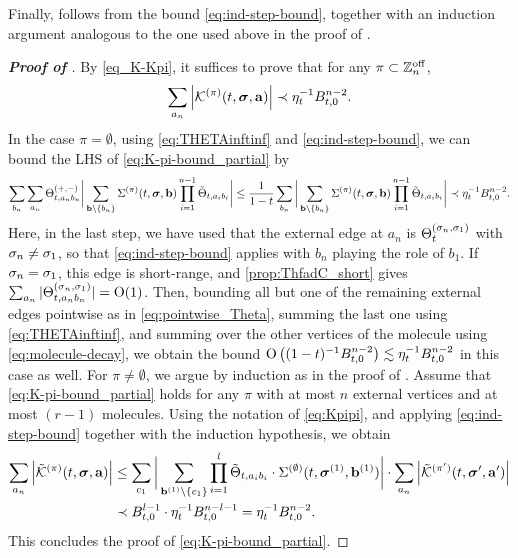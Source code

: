 Finally,  follows from the bound \eqref{eq:ind-step-bound}, together with an induction argument analogous to the one used above in the proof of .

\begin{proof}[\bf Proof of ]
By \eqref{eq_K-Kpi}, it suffices to prove that for any $\pi \subset \mathbb{Z}^{\rm{off}}_n$, 
\begin{equation}\label{eq:K-pi-bound_partial}
 \sum_{a_n}   \left|\mathcal{K}^{(\pi)}(t, {\boldsymbol{\sigma}}, \mathbf{a})\right| \prec \eta_t^{-1}B_{t,0}^{n-2}.
\end{equation}
In the case $\pi=\emptyset$, using \eqref{eq:THETAinftinf} and \eqref{eq:ind-step-bound}, we can bound the LHS of \eqref{eq:K-pi-bound_partial} by 
\begin{equation}\nonumber
 \sum_{b_n} \sum_{a_n}\Theta^{(+,-)}_{t,a_n b_n} \bigg|\sum_{\mathbf{b}\setminus \{b_n\}} \Sigma^{(\pi)}(t, {\boldsymbol{\sigma}}, \mathbf{b}) \prod_{i=1}^{n-1} \tilde{\Theta}_{t,a_i b_i}\bigg| \le \frac{1}{1-t}\sum_{b_n} \bigg|\sum_{\mathbf{b}\setminus \{b_n\}} \Sigma^{(\pi)}(t, {\boldsymbol{\sigma}}, \mathbf{b}) \prod_{i=1}^{n-1} \tilde{\Theta}_{t,a_i b_i}\bigg| \prec \eta_t^{-1}B_{t,0}^{n-2}.
\end{equation} 
Here, in the last step, we have used that the external edge at $a_n$ is $\Theta^{(\sigma_n,\sigma_1)}_t$ with $\sigma_n\ne\sigma_1$, so that \eqref{eq:ind-step-bound} applies with $b_n$ playing the role of $b_1$. If $\sigma_n=\sigma_1$, this edge is short-range, and \eqref{prop:ThfadC_short} gives $\sum_{a_n}|\Theta^{(\sigma_n,\sigma_1)}_{t,a_nb_n}|=\operatorname{O}(1)$. Then, bounding all but one of the remaining external edges pointwise as in \eqref{eq:pointwise_Theta}, summing the last one using \eqref{eq:THETAinftinf}, and summing over the other vertices of the molecule using \eqref{eq:molecule-decay}, we obtain the bound $\operatorname{O}\big((1-t)^{-1}B_{t,0}^{n-2}\big)\lesssim\eta_t^{-1}B_{t,0}^{n-2}$ in this case as well. 
For $\pi\ne \emptyset$, we argue by induction as in the proof of .
Assume that \eqref{eq:K-pi-bound_partial} holds for any $\pi$ with at most $n$ external vertices and at most $(r-1)$ molecules. Using the notation of \eqref{eq:Kpipi}, and applying \eqref{eq:ind-step-bound} together with the induction hypothesis, we obtain
\begin{align*}
\sum_{a_n} \left|\tilde{\mathcal{K}}^{(\pi)}(t, {\boldsymbol{\sigma}}, \mathbf{a})\right| &\le \sum_{c_1}\bigg|\sum_{\mathbf{b}^{(1)}\setminus \{c_1\}} \prod_{i=1}^l \tilde{\Theta}_{t,a_i b_i} \cdot \Sigma^{(\emptyset)}(t, {\boldsymbol{\sigma}}^{(1)}, \mathbf{b}^{(1)})\bigg| \cdot \sum_{a_n}\left|\tilde{\mathcal{K}}^{(\pi')}(t, {\boldsymbol{\sigma}}', \mathbf{a}')\right| \\
&\prec B_{t, 0}^{l-1} \cdot \eta_t^{-1}B_{t, 0}^{n-l-1} =\eta_t^{-1} B_{t, 0}^{n-2}. 
\end{align*}
This concludes the proof of \eqref{eq:K-pi-bound_partial}.
\end{proof}














